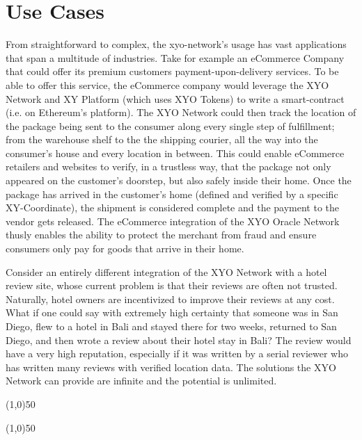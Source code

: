 \documentclass{article}
\begin{document}
\section*{Use Cases}
From straightforward to complex, the \Gls{xyo-network}'s usage  has vast applications that span a multitude of industries. Take for example an eCommerce Company that could offer its premium customers payment-upon-delivery services. To be able to offer this service, the eCommerce company would leverage the XYO Network and XY Platform (which uses XYO Tokens) to write a \gls{smart-contract} (i.e. on Ethereum's platform). The XYO Network could then track the location of the package being sent to the consumer along every single step of fulfillment; from the warehouse shelf to the the shipping courier, all the way into the consumer's house and every location in between. This could enable eCommerce retailers and websites to verify, in a trustless way, that the package not only appeared on the customer's doorstep, but also safely inside their home. Once the package has arrived in the customer's home (defined and verified by a specific XY-Coordinate), the shipment is considered complete and the payment to the vendor gets released. The eCommerce integration of the XYO Oracle Network thusly enables the ability to protect the merchant from fraud and ensure consumers only pay for goods that arrive in their home.

Consider an entirely different integration of the XYO Network with a hotel review site, whose current problem is that their reviews are often not trusted. Naturally, hotel owners are incentivized to improve their reviews at any cost. What if one could say with extremely high \gls{certainty} that someone was in San Diego, flew to a hotel in Bali and stayed there for two weeks, returned to San Diego, and then wrote a review about their hotel stay in Bali? The review would have a very high reputation, especially if it was written by a serial reviewer who has written many reviews with verified location data. The solutions the XYO Network can provide are infinite and the potential is unlimited.
\begin{center}
\line(1,0){50}
\end{center}




\begin{center}
\line(1,0){50}
\end{center}
\end{document}
